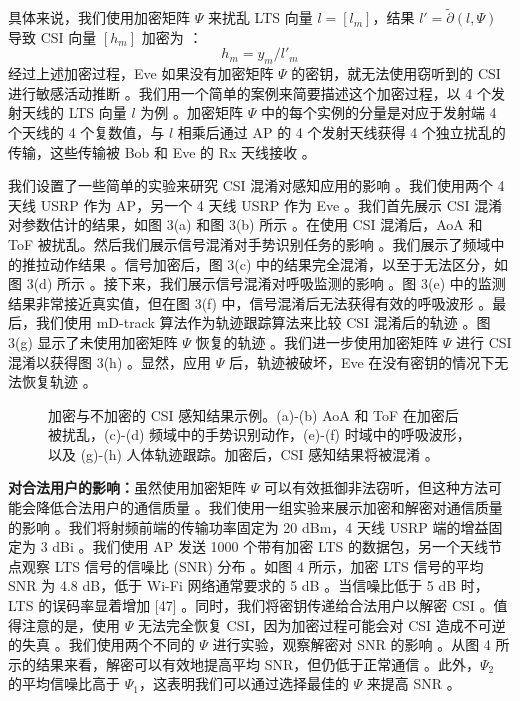 \documentclass[journal]{IEEEtran}
\begin{document}
具体来说，我们使用加密矩阵 $\Psi$ 来扰乱 LTS 向量 $l=[l_{m}]$，结果 $l'=\tilde{\partial}(l,\Psi)$ 导致 CSI 向量 $[h_{m}]$ 加密为 ：
\begin{equation}
h_{m}=y_{m}/l'_{m}
\end{equation}
经过上述加密过程，Eve 如果没有加密矩阵 $\Psi$ 的密钥，就无法使用窃听到的 CSI 进行敏感活动推断 。我们用一个简单的案例来简要描述这个加密过程，以 4 个发射天线的 LTS 向量 $l$ 为例 。加密矩阵 $\Psi$ 中的每个实例的分量是对应于发射端 4 个天线的 4 个复数值，与 $l$ 相乘后通过 AP 的 4 个发射天线获得 4 个独立扰乱的传输，这些传输被 Bob 和 Eve 的 Rx 天线接收 。

我们设置了一些简单的实验来研究 CSI 混淆对感知应用的影响 。我们使用两个 4 天线 USRP 作为 AP，另一个 4 天线 USRP 作为 Eve 。我们首先展示 CSI 混淆对参数估计的结果，如图 3(a) 和图 3(b) 所示 。在使用 CSI 混淆后，AoA 和 ToF 被扰乱。然后我们展示信号混淆对手势识别任务的影响 。我们展示了频域中的推拉动作结果 。信号加密后，图 3(c) 中的结果完全混淆，以至于无法区分，如图 3(d) 所示 。接下来，我们展示信号混淆对呼吸监测的影响 。图 3(e) 中的监测结果非常接近真实值，但在图 3(f) 中，信号混淆后无法获得有效的呼吸波形 。最后，我们使用 mD-track 算法作为轨迹跟踪算法来比较 CSI 混淆后的轨迹 。图 3(g) 显示了未使用加密矩阵 $\Psi$ 恢复的轨迹 。我们进一步使用加密矩阵 $\Psi$ 进行 CSI 混淆以获得图 3(h) 。显然，应用 $\Psi$ 后，轨迹被破坏，Eve 在没有密钥的情况下无法恢复轨迹 。

\begin{figure}[htbp]
\centering
\caption{加密与不加密的 CSI 感知结果示例。(a)-(b) AoA 和 ToF 在加密后被扰乱，(c)-(d) 频域中的手势识别动作，(e)-(f) 时域中的呼吸波形，以及 (g)-(h) 人体轨迹跟踪。加密后，CSI 感知结果将被混淆 。}
\label{fig:encryption_impact}
\end{figure}

\textbf{对合法用户的影响：}虽然使用加密矩阵 $\Psi$ 可以有效抵御非法窃听，但这种方法可能会降低合法用户的通信质量 。我们使用一组实验来展示加密和解密对通信质量的影响 。我们将射频前端的传输功率固定为 20 dBm，4 天线 USRP 端的增益固定为 3 dBi 。我们使用 AP 发送 1000 个带有加密 LTS 的数据包，另一个天线节点观察 LTS 信号的信噪比 (SNR) 分布 。如图 4 所示，加密 LTS 信号的平均 SNR 为 4.8 dB，低于 Wi-Fi 网络通常要求的 5 dB 。当信噪比低于 5 dB 时，LTS 的误码率显着增加 [47] 。同时，我们将密钥传递给合法用户以解密 CSI 。值得注意的是，使用 $\Psi$ 无法完全恢复 CSI，因为加密过程可能会对 CSI 造成不可逆的失真 。我们使用两个不同的 $\Psi$ 进行实验，观察解密对 SNR 的影响 。从图 4 所示的结果来看，解密可以有效地提高平均 SNR，但仍低于正常通信 。此外，$\Psi_{2}$ 的平均信噪比高于 $\Psi_{1}$，这表明我们可以通过选择最佳的 $\Psi$ 来提高 SNR 。
\end{document}
